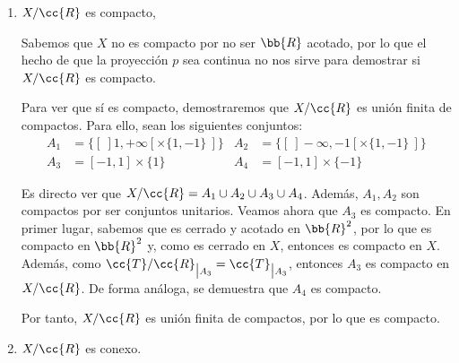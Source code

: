 \documentclass[12pt]{article}
\newcommand{\T}[0]{\cc{T}}
\begin{document}
\begin{ejercicio}[2.5 puntos]
\begin{enumerate}
            Por tanto, no es T2.\\

            Otra opción de ver que no es T2 es ver que tampoco es T1. Para esto, veamos que
            $\{[~]1, +\infty[ \times \{1,-1\}~]\}$ no es cerrado en $X/\cc{R}$.
            
            Buscamos $U\subset X$ saturado y cerrado tal que $p(U) = \{[~]1, +\infty[ \times \{1,-1\}~]\}$.
            El único conjunto saturado de $X$ tal que $p(U) = \{[~]1, +\infty[ \times \{1,-1\}~]\}$ es
            $U = ]1, +\infty[ \times \{1,-1\}$, que no es cerrado, por lo que no existe dicho
            conjunto saturado y cerrado. Por tanto, $\{[~]1, +\infty[ \times \{1,-1\}~]\}$ no es cerrado,
            por lo que $X/\cc{R}$ no es T1, por lo que tampoco es T2.

            \item $X/\cc{R}$ es compacto,
            
            Sabemos que $X$ no es compacto por no ser $\bb{R}$ acotado, por lo que el hecho de que la proyección
            $p$ sea continua no nos sirve para demostrar si $X/\cc{R}$ es compacto.

            Para ver que sí es compacto, demostraremos que $X/\cc{R}$ es unión finita de compactos.
            Para ello, sean los siguientes conjuntos:
            \begin{align*}
              A_1 &= \{[~]1, +\infty[ \times \{1,-1\}~]\}&
              A_2 &= \{[~]-\infty, -1[ \times \{1,-1\}~]\}
              \\
              A_3 &= [-1,1] \times \{1\}&
              A_4 &= [-1,1] \times \{-1\}
            \end{align*}

            Es directo ver que $X/\cc{R} = A_1 \cup A_2 \cup A_3 \cup A_4$.
            Además, $A_1,A_2$ son compactos por ser conjuntos unitarios.
            Veamos ahora que $A_3$ es compacto. En primer lugar, sabemos que
            es cerrado y acotado en $\bb{R}^2$, por lo que es compacto en $\bb{R}^2$ y,
            como es cerrado en $X$, entonces es compacto en $X$. Además, como
            ${\T/\cc{R}}_{\big|A_3} = \T_{\big|A_3}$, entonces $A_3$ es compacto en
            $X/\cc{R}$. De forma análoga, se demuestra que $A_4$ es compacto.

            Por tanto, $X/\cc{R}$ es unión finita de compactos, por lo que es compacto.

            \item $X/\cc{R}$ es conexo.
            

\end{enumerate}
\end{ejercicio}
\end{document}
